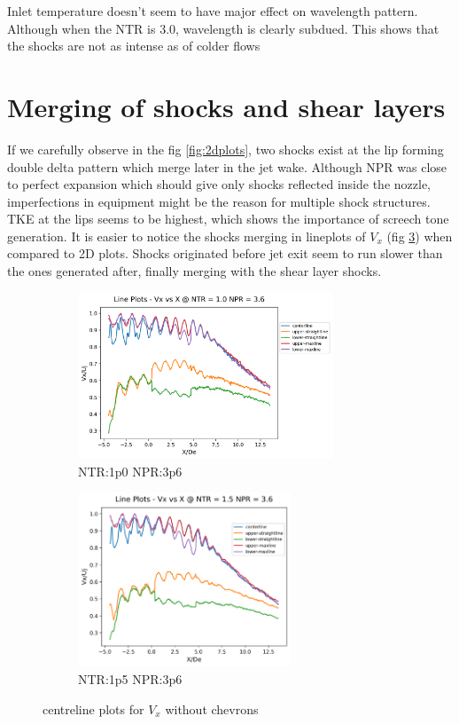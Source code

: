 Inlet temperature doesn't seem to have major effect on wavelength pattern. Although when the NTR is 3.0, wavelength is clearly subdued. This shows that the shocks are not as intense as of colder flows \\

\section{Merging of shocks and shear layers}
If we carefully observe in the fig \ref{fig:2dplots}, two shocks exist at the lip forming double delta pattern which merge later in the jet wake. Although NPR was close to perfect expansion which should give only shocks reflected inside the nozzle, imperfections in equipment might be the reason for multiple shock structures. TKE at the lips seems to be highest, which shows the importance of screech tone generation. It is easier to notice the shocks merging in lineplots of $V_x$ (fig \ref{fig:lineplotsVx}) when compared to 2D plots. Shocks originated before jet exit seem to run slower than the ones generated after, finally merging with the shear layer shocks.\\ 
 
\begin{figure}[H]
\begin{subfigure}{.5\textwidth}
	\centering
	\includegraphics[width=3in]{images/LinePlots_Vx_NTR1p0_NPR3p6.png}
	\caption{NTR:1p0 NPR:3p6 }
	\label{fig:lineplotsVx1p03p6}
\end{subfigure}%
\begin{subfigure}{.5\textwidth}
	\centering
	\includegraphics[width=2.5in]{images/LinePlots_Vx_NTR1p5_NPR3p6.png}
	\caption{NTR:1p5 NPR:3p6 }
	\label{fig:lineplotsVx1p53p6}
\end{subfigure}
\caption{centreline plots for $V_x$ without chevrons }
\label{fig:lineplotsVx}
\end{figure} 

